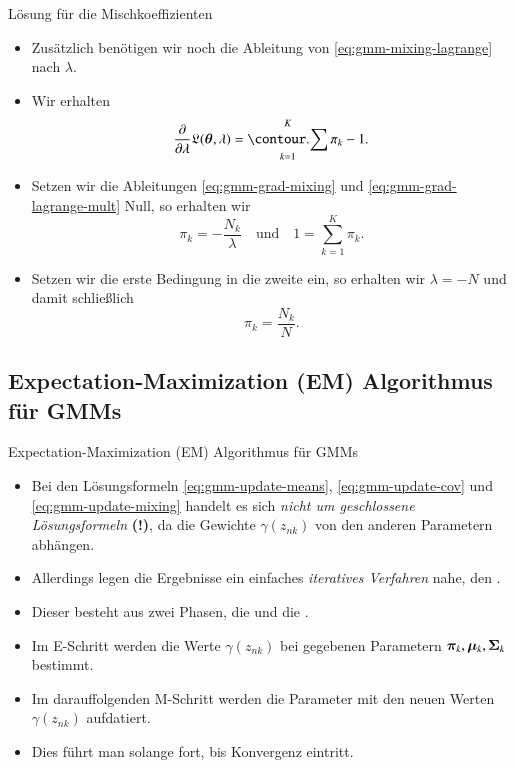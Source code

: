 \begin{frame}{Lösung für die Mischkoeffizienten}{}
	\begin{itemize}
		\item Zusätzlich benötigen wir noch die Ableitung von \eqref{eq:gmm-mixing-lagrange} nach $\lambda$.
		\item Wir erhalten
		\begin{equation} \label{eq:gmm-grad-lagrange-mult}
			\frac{\partial}{\partial\lambda} \lagrange(\btheta, \lambda) = \sum_{k=1}^K \pi_k - 1.
		\end{equation}
		\item Setzen wir die Ableitungen \eqref{eq:gmm-grad-mixing} und \eqref{eq:gmm-grad-lagrange-mult} Null, so erhalten wir
		\begin{equation*}
			\pi_k = -\frac{N_k}{\lambda}
		\quad\text{und}\quad
			1 = \sum_{k=1}^K \pi_k.
		\end{equation*}
		\item Setzen wir die erste Bedingung in die zweite ein, so erhalten wir $\lambda = -N$ und damit schließlich
		\begin{equation} \label{eq:gmm-update-mixing}
			\pi_k = \frac{N_k}{N}.
		\end{equation}
	\end{itemize}
\end{frame}


\subsection{Expectation-Maximization (EM) Algorithmus für GMMs}

\begin{frame}{Expectation-Maximization (EM) Algorithmus für GMMs}{}
	\begin{itemize}
		\item Bei den Lösungsformeln \eqref{eq:gmm-update-means}, \eqref{eq:gmm-update-cov} und \eqref{eq:gmm-update-mixing}
			handelt es sich \textit{nicht um geschlossene Lösungsformeln} \textbf{(!)}, da die Gewichte $\gamma(z_{nk})$ von den anderen
			Parametern abhängen.
		\item Allerdings legen die Ergebnisse ein einfaches \textit{iteratives Verfahren} nahe,
			den .
		\item Dieser besteht aus zwei Phasen, die  und die .
		\item Im E-Schritt werden die Werte $\gamma(z_{nk})$ bei gegebenen Parametern $\bm{\pi}_k, \bm{\mu}_k, \bm{\Sigma}_k$ bestimmt.
		\item Im darauffolgenden M-Schritt werden die Parameter mit den neuen Werten $\gamma(z_{nk})$ aufdatiert.
		\item Dies führt man solange fort, bis Konvergenz eintritt.
	\end{itemize}
\end{frame}


